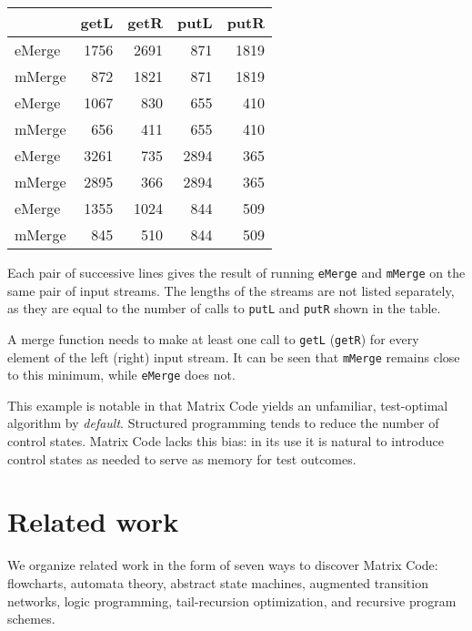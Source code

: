 \documentclass[preprint,11pt]{elsarticle}
\begin{document}
\begin{center}
\begin{tabular}{l||r|r|r|r}
    & getL & getR & putL & putR \\
\hline \hline
eMerge  & 1756 & 2691 & 871 & 1819 \\
\hline
mMerge  & 872 & 1821 & 871 & 1819 \\
\hline \hline
eMerge  & 1067 & 830 & 655 & 410 \\
\hline
mMerge  & 656 & 411 & 655 & 410 \\
\hline \hline
eMerge  & 3261 & 735 & 2894 & 365 \\
\hline
mMerge  & 2895 & 366 & 2894 & 365 \\
\hline \hline
eMerge  & 1355 & 1024 & 844 & 509 \\
\hline
mMerge  & 845 & 510 & 844 & 509 \\
\hline \hline
\end{tabular}
\end{center}

Each pair of successive lines gives the result of
running {\tt eMerge} and {\tt mMerge}
on the same pair of input streams.
The lengths of the streams are not listed separately,
as they are equal to the number of calls to {\tt putL}
and {\tt putR} shown in the table.

A merge function needs to make at least one call
to {\tt getL} ({\tt getR}) for every element of the left (right)
input stream.
It can be seen that {\tt mMerge} remains close to this minimum,
while {\tt eMerge} does not.

This example is notable
in that Matrix Code yields
an unfamiliar, test-optimal algorithm
by \emph{default}.
Structured programming tends to reduce
the number of control states.
Matrix Code lacks this bias:
in its use it is natural to introduce control states
as needed to serve as memory for test outcomes.




\section{Related work}

We organize related work in the form of seven ways
to discover Matrix Code:
flowcharts,
automata theory,
abstract state machines,
augmented transition networks,
logic programming,
tail-recursion optimization,
and
recursive program schemes.
\end{document}
